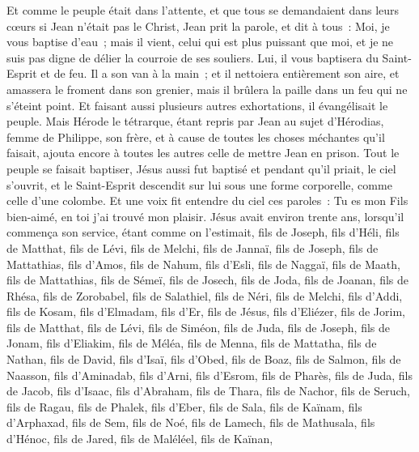 \begin{multicols}{2}
Et comme le peuple était dans l'attente, et que tous se demandaient dans leurs cœurs si Jean n'était pas le Christ,
Jean prit la parole, et dit à tous~: Moi, je vous baptise d'eau~; mais il vient, celui qui est plus puissant que moi, et je ne suis pas digne de délier la courroie de ses souliers. Lui, il vous baptisera du Saint-Esprit et de feu.
Il a son van à la main~; et il nettoiera entièrement son aire, et amassera le froment dans son grenier, mais il brûlera la paille dans un feu qui ne s'éteint point.
Et faisant aussi plusieurs autres exhortations, il évangélisait le peuple.
Mais Hérode le tétrarque, étant repris par Jean au sujet d'Hérodias, femme de Philippe, son frère, et à cause de toutes les choses méchantes qu'il faisait,
ajouta encore à toutes les autres celle de mettre Jean en prison.
Tout le peuple se faisait baptiser, Jésus aussi fut baptisé et pendant qu'il priait, le ciel s'ouvrit,
et le Saint-Esprit descendit sur lui sous une forme corporelle, comme celle d'une colombe. Et une voix fit entendre du ciel ces paroles~: Tu es mon Fils bien-aimé, en toi j'ai trouvé mon plaisir.
Jésus avait environ trente ans, lorsqu'il commença son service, étant comme on l'estimait, fils de Joseph, fils d'Héli,
fils de Matthat, fils de Lévi, fils de Melchi, fils de Jannaï, fils de Joseph,
fils de Mattathias, fils d'Amos, fils de Nahum, fils d'Esli, fils de Naggaï,
fils de Maath, fils de Mattathias, fils de Sémeï, fils de Josech, fils de Joda,
fils de Joanan, fils de Rhésa, fils de Zorobabel, fils de Salathiel, fils de Néri,
fils de Melchi, fils d'Addi, fils de Kosam, fils d'Elmadam, fils d'Er,
fils de Jésus, fils d'Eliézer, fils de Jorim, fils de Matthat, fils de Lévi,
fils de Siméon, fils de Juda, fils de Joseph, fils de Jonam, fils d'Eliakim,
fils de Méléa, fils de Menna, fils de Mattatha, fils de Nathan, fils de David,
fils d'Isaï, fils d'Obed, fils de Boaz, fils de Salmon, fils de Naasson,
fils d'Aminadab, fils d'Arni, fils d'Esrom, fils de Pharès, fils de Juda,
fils de Jacob, fils d'Isaac, fils d'Abraham, fils de Thara, fils de Nachor,
fils de Seruch, fils de Ragau, fils de Phalek, fils d'Eber, fils de Sala,
fils de Kaïnam, fils d'Arphaxad, fils de Sem, fils de Noé, fils de Lamech,
fils de Mathusala, fils d'Hénoc, fils de Jared, fils de Maléléel, fils de Kaïnan,

\end{multicols}
